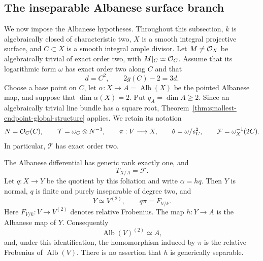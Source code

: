 \subsection{The inseparable Albanese surface branch}
\label{subsec:smallest-endpoint-albanese-geometry}

We now impose the Albanese hypotheses.  Throughout this subsection,
$k$ is algebraically closed of characteristic two, $X$ is a smooth
integral projective surface, and $C\subset X$ is a smooth integral
ample divisor.  Let $M\ne\mathcal O_X$ be algebraically trivial of exact
order two, with $M|_C\simeq\mathcal O_C$.  Assume that its logarithmic form
$\omega$ has exact order two along $C$ and that
\[
 d=C^2,\qquad 2g(C)-2=3d.
\]
Choose a base point on $C$, let
$\alpha:X\to A=\operatorname{Alb}(X)$ be the pointed Albanese map,
and suppose that $\dim\alpha(X)=2$.  Put $q_A=\dim A\ge2$.
Since an algebraically trivial line bundle has a square root,
Theorem~\ref{thm:smallest-endpoint-global-structure} applies.
We retain its notation
\[
 N=\mathcal O_C(C),\qquad
 \mathcal T=\omega_C\otimes N^{-3},\qquad
 \pi:V\longrightarrow X,\qquad
 \theta=\omega/s_C^2,\qquad
 \mathcal F=\omega_X^{-1}(2C).
\]
In particular, $\mathcal T$ has exact order two.

\begin{proposition}
\label{prop:smallest-endpoint-albanese-quotient}
The Albanese differential has generic rank exactly one, and
\[
 T_{X/A}=\mathcal F.
\]
Let $q:X\to Y$ be the quotient by this foliation and write
$\alpha=hq$.  Then $Y$ is normal, $q$ is finite and purely inseparable
of degree two, and
\begin{equation}\label{eq:smallest-endpoint-albanese-quotient}
 Y\simeq V^{(2)},\qquad q\pi=F_{V/k}.
\end{equation}
Here $F_{V/k}:V\to V^{(2)}$ denotes relative Frobenius.
The map $h:Y\to A$ is the Albanese map of $Y$.
Consequently
\begin{equation}\label{eq:smallest-endpoint-albanese-frobenius}
 \operatorname{Alb}(V)^{(2)}\simeq A,
\end{equation}
and, under this identification, the homomorphism induced by
$\pi$ is the relative Frobenius of $\operatorname{Alb}(V)$.
There is no assertion that $h$ is generically separable.
\end{proposition}

